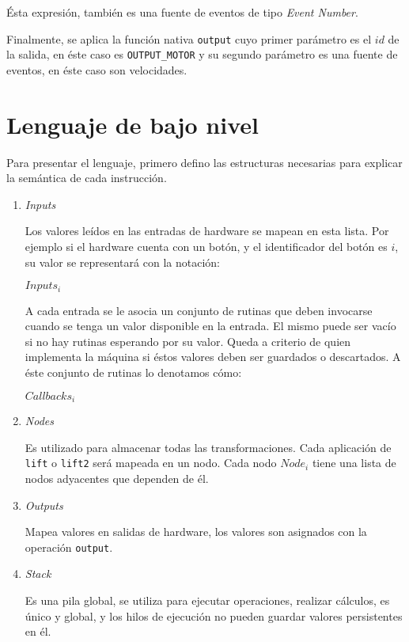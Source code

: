   Ésta expresión, también es una fuente de eventos
de tipo \emph{Event Number}.

  Finalmente, se aplica la función nativa \texttt{output} cuyo
primer parámetro es el $id$ de la salida, en éste caso es \texttt{OUTPUT\_MOTOR}
y su segundo parámetro es una fuente de eventos,
en éste caso son velocidades.


\section{Lenguaje de bajo nivel}

 Para presentar el lenguaje, primero defino las estructuras
necesarias para explicar la semántica de cada instrucción.

\begin{enumerate}

\item \emph{Inputs}

  Los valores leídos en las entradas de hardware se mapean
en esta lista. Por ejemplo si el hardware cuenta con un botón,
y el identificador del botón es $i$,
su valor se representará con la notación:

  $Inputs_i$

  A cada entrada se le asocia un conjunto de
rutinas que deben invocarse cuando se tenga un
valor disponible en la entrada. El mismo puede ser vacío si
no hay rutinas esperando por su valor. Queda a criterio de quien
implementa la máquina si éstos valores deben ser guardados o
descartados.
  A éste conjunto de rutinas lo denotamos cómo:

  $Callbacks_i$

\item \emph{Nodes}

  Es utilizado para almacenar todas las transformaciones.
  Cada aplicación de \texttt{lift} o \texttt{lift2} será mapeada en un nodo.
  Cada nodo $Node_i$ tiene una lista de nodos adyacentes
que dependen de él.

\item \emph{Outputs}

  Mapea valores en salidas de hardware, los valores
  son asignados con la operación \texttt{output}.

\item \emph{Stack}

Es una pila global, se utiliza para ejecutar operaciones,
realizar cálculos, es único
y global, y los hilos de ejecución no pueden guardar valores
persistentes en él.


\end{enumerate}
